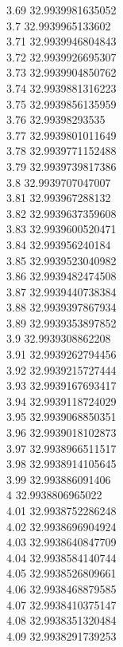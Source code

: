 {3.69	32.9939981635052\\
3.7	32.9939965133602\\
3.71	32.9939946804843\\
3.72	32.9939926695307\\
3.73	32.9939904850762\\
3.74	32.9939881316223\\
3.75	32.9939856135959\\
3.76	32.99398293535\\
3.77	32.9939801011649\\
3.78	32.9939771152488\\
3.79	32.9939739817386\\
3.8	32.9939707047007\\
3.81	32.993967288132\\
3.82	32.9939637359608\\
3.83	32.9939600520471\\
3.84	32.993956240184\\
3.85	32.9939523040982\\
3.86	32.9939482474508\\
3.87	32.9939440738384\\
3.88	32.9939397867934\\
3.89	32.9939353897852\\
3.9	32.9939308862208\\
3.91	32.9939262794456\\
3.92	32.9939215727444\\
3.93	32.9939167693417\\
3.94	32.9939118724029\\
3.95	32.9939068850351\\
3.96	32.9939018102873\\
3.97	32.9938966511517\\
3.98	32.9938914105645\\
3.99	32.993886091406\\
4	32.9938806965022\\
4.01	32.9938752286248\\
4.02	32.9938696904924\\
4.03	32.9938640847709\\
4.04	32.9938584140744\\
4.05	32.9938526809661\\
4.06	32.9938468879585\\
4.07	32.9938410375147\\
4.08	32.9938351320484\\
4.09	32.9938291739253\\
}
